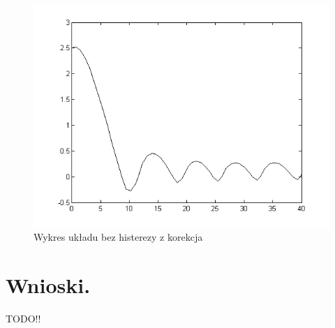 \documentclass[a4paper,10pt]{article}
\begin{document}
\begin{enumerate}
\newpage
\begin{figure}[!h]
    \centering
	\includegraphics[width=120mm]{CW3-korekcja-trojpolozeniowyBH-e_a.png}
	\caption{Wykres układu bez histerezy z korekcja}
    \label{fig:Rysunek}
\end{figure}

\end{enumerate}

\newpage

\section{Wnioski.}\label{sec:wnioski}
TODO!!
\end{document}

